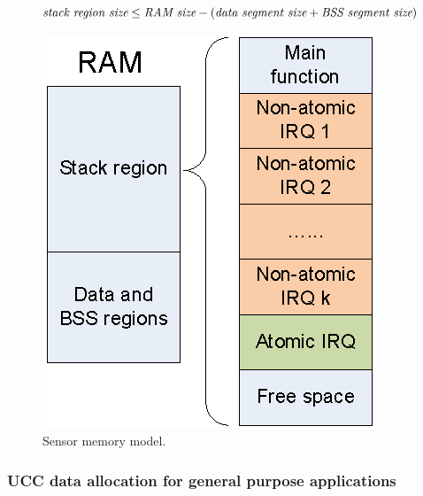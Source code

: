 \begin{small}
\begin{equation}
\mbox{\it stack region size}\leq \mbox{\it RAM size} - (\mbox{\it data segment size} + \mbox{\it BSS segment size})
\end{equation}

\end{small}

\begin{figure}[h]
\centering
\includegraphics[scale=1]{figures/ram.eps}
\caption{Sensor memory model.}
\label{ram}
\end{figure}

\subsubsection{UCC data allocation for general purpose applications}

